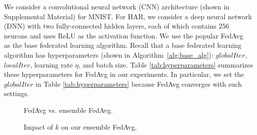 \documentclass[letterpaper]{article} %
\begin{document}
We consider a convolutional neural network (CNN) architecture (shown in Supplemental Material) for MNIST. For HAR, we consider a deep neural network (DNN) with two fully-connected hidden layers, each of which contains 256 neurons and uses ReLU as the activation function. We use the popular FedAvg~\cite{mcmahan2016communication} as the base federated learning algorithm. Recall that a base federated learning algorithm has hyperparameters (shown in Algorithm~\ref{alg:base_alg}): $globalIter$, $localIter$,  learning rate $\eta$, and batch size. Table \ref{tab:hyperparameters} summarizes these hyperparameters for FedAvg in our experiments. In particular, we set the $globalIter$ in Table \ref{tab:hyperparameters} because FedAvg converges with such settings. 


\begin{figure}[!t]
    \center
    \vspace{-2mm}
    \vspace{-3mm}
    \caption{FedAvg vs. ensemble FedAvg.}
    \label{fig:q_compare}
\vspace{-3mm}
\end{figure}

\begin{figure}[!t]
    \center
    \vspace{-3mm}
    \caption{Impact of $k$ on our ensemble FedAvg.}
    \label{fig:k}
\vspace{-1mm}
\end{figure}
\end{document}

